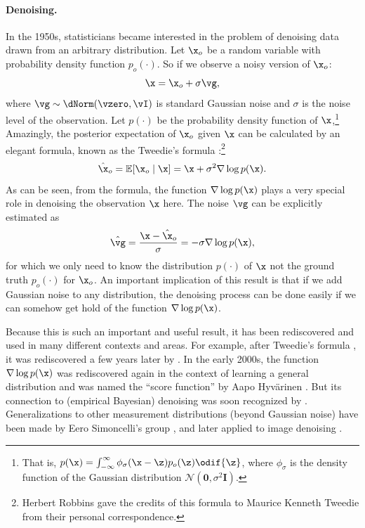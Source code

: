 \documentclass[../../book-main.tex]{subfiles}
\begin{document}
\paragraph{Denoising.} In the 1950s, statisticians became interested in the problem of denoising data drawn from an arbitrary distribution. Let $\x_o$ be a random variable with probability density function $p_o(\cdot)$. So if we observe a noisy version of $\x_o$:
\begin{equation}
    \x = \x_o + \sigma \vg, 
\end{equation}
where $\vg \sim \dNorm(\vzero, \vI)$ is standard Gaussian noise and $\sigma$ is the noise level of the observation. Let $p(\cdot)$ be the probability density function of $\x$,\footnote{That is, $p(\x) = \int_{-\infty}^{\infty} \phi_{\sigma}(\x - \z)p_o(\z) \odif{\z}$, where $\phi_{\sigma}$ is the density function of the Gaussian distribution $\mathcal{N}(\boldsymbol{0}, \sigma^2 \boldsymbol{I})$.} Amazingly, the posterior expectation of $\x_o$ given $\x$ can be calculated by an elegant formula, known as the Tweedie's formula \cite{Robbins1956AnEB}:\footnote{Herbert Robbins gave the credits of this formula to Maurice Kenneth Tweedie from their personal correspondence.}
\begin{equation}
    \hat \x_o = \mathbb{E}[\x_o\mid \x] = \x + \sigma^2 \nabla \log p(\x).
\end{equation}
As can be seen, from the formula, the function $\nabla \log p(\x)$ plays a very special role in denoising the observation $\x$ here. The noise $\vg$ can be explicitly estimated as
\begin{equation}
    \hat{\vg} = \frac{\x - \hat \x_o}{\sigma} = -\sigma \nabla \log p(\x),
\end{equation}
for which we only need to know the distribution $p(\cdot)$ of $\x$ not the ground truth $p_o(\cdot)$ for $\x_o$. An important implication of this result is that if we add Gaussian noise to any distribution, the denoising process can be done easily if we can somehow get hold of the function $\nabla \log p(\x)$.

Because this is such an important and useful result, it has been rediscovered and used in many different contexts and areas. For example, after Tweedie's formula \cite{Robbins1956AnEB}, it was rediscovered a few years later by \cite{Miyasawa61}. In the early 2000s, the function $\nabla \log p(\x)$ was rediscovered again in the context of learning a general distribution and was named the ``score function'' by Aapo Hyv\"{a}rinen \cite{hyvarinen05a}. But its connection to (empirical Bayesian) denoising was soon recognized by \cite{Vincent2011}.
Generalizations to other measurement distributions (beyond Gaussian noise) have been made by Eero Simoncelli's group \cite{Raphan10}, and later applied to image denoising \cite{Kadkhodaie21a,ho2020denoising}.
\end{document}
